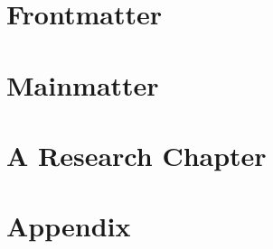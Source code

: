 \documentclass[12pt,openright,oneside,a4paper,brazil,english]{article}
\author{Gabriel Petrini da Silveira}
\date{\today}
\title{}
\numberwithin{equation}{chapter}
\numberwithin{listing}{chapter}
\begin{document}
\section{Frontmatter}
\label{sec:orgb20b6f8}
\frontmatter


\section{Mainmatter}
\label{sec:orgd39957c}

\tableofcontents
\mainmatter


\section[Paper]{A Research Chapter}
\label{sec:org2e615e3}


\section{Appendix}
\label{sec:orgaf5b6df}

\appendix
\end{document}
